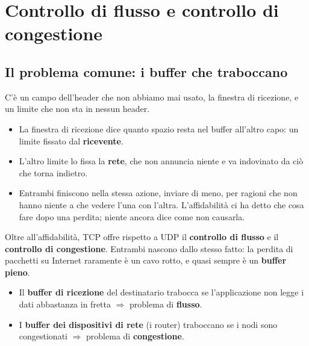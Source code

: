\chapter{Controllo di flusso e controllo di congestione}

\section{Il problema comune: i buffer che traboccano}

C'è un campo dell'header che non abbiamo mai usato, la finestra di ricezione, e un limite che non sta in nessun header.
\begin{itemize}
    \item La finestra di ricezione dice quanto spazio resta nel buffer all'altro capo: un limite fissato dal
          \textbf{ricevente}.
    \item L'altro limite lo fissa la \textbf{rete}, che non annuncia niente e va indovinato da ciò che torna indietro.
    \item Entrambi finiscono nella stessa azione, inviare di meno, per ragioni che non hanno niente a che vedere l'una con
          l'altra. L'affidabilità ci ha detto che cosa fare dopo una perdita; niente ancora dice come non causarla.
\end{itemize}

Oltre all'affidabilità, TCP offre rispetto a UDP il \textbf{controllo di flusso} e il \textbf{controllo di
congestione}. Entrambi nascono dallo stesso fatto: la perdita di pacchetti su Internet raramente è un cavo rotto, e quasi
sempre è un \textbf{buffer pieno}.

\begin{itemize}
    \item Il \textbf{buffer di ricezione} del destinatario trabocca se l'applicazione non legge i dati abbastanza
          in fretta $\Rightarrow$ problema di \textbf{flusso}.
    \item I \textbf{buffer dei dispositivi di rete} (i router) traboccano se i nodi sono congestionati
          $\Rightarrow$ problema di \textbf{congestione}.
\end{itemize}

